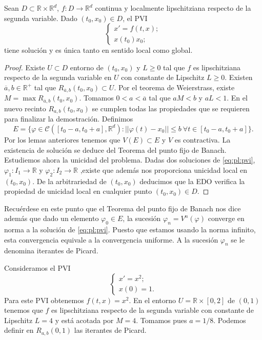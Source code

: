 \documentclass{article}
\begin{document}
\begin{thm}
  Sean $D \subset \mathbb{R} \times \mathbb{R}^d$, $f: D \to \mathbb{R}^d$ continua y localmente
  lipschitziana respecto de la segunda variable. Dado $(t_0, x_0) \in D$, el PVI
  \begin{equation}
    \label{eq:pl:pvi}
    \begin{cases}
      x' = f(t,x); \\ x(t_0) x_0;
    \end{cases}
  \end{equation}
  tiene solución y es única tanto en sentido local como global.
\end{thm}
\begin{proof}
  Existe $U \subset D$ entorno de $(t_0, x_0)$ y $L \ge 0$ tal que $f$ es lipschitziana respecto de
  la segunda variable en $U$ con constante de Lipschitz $L \ge 0$. Existen
  $\overline{a}, b \in \mathbb{R}^+$ tal que $R_{\overline{a},b}(t_0, x_0) \subset U$. Por el
  teorema de Weierstrass, existe $M = \max R_{\overline{a},b}(t_0, x_0)$. Tomamos
  $0 < a < \overline{a}$ tal que $a M < b$ y $a L < 1$. En el nuevo recinto $R_{a,b}(t_0, x_0)$ se
  cumplen todas las propiedades que se requieren para finalizar la demostración. Definimos
  \[E = \{\varphi \in \mathcal{C}([t_0-a, t_0+a], \mathbb{R}^d): ||\varphi(t)-x_0|| \le b \ \forall
    t \in [t_0-a, t_0+a]\}.\] Por los lemas anteriores tenemos que $V(E) \subset E$ y $V$ es
  contractiva. La existencia de solución se deduce del Teorema del punto fijo de Banach. Estudiemos
  ahora la unicidad del problema. Dadas dos soluciones de \eqref{eq:pl:pvi},
  $\varphi_1: I_1 \to \mathbb{R}$ y $\varphi_2: I_2 \to \mathbb{R}$ ,existe que además nos
  proporciona unicidad local en $(t_0, x_0)$.  De la arbitrariedad de $(t_0, x_0)$ deducimos que la
  EDO verifica la propiedad de unicidad local en cualquier punto $(t_0, x_0) \in D$.
\end{proof}

Recuérdese en este punto que el Teorema del punto fijo de Banach nos dice además que dado un elemento $\varphi_0 \in E$, la sucesión $\varphi_n = V^n(\varphi)$ converge en norma a la solución de \ref{eq:pl:pvi}. Puesto que estamos usando la norma infinito, esta convergencia equivale a la convergencia uniforme. A la sucesión $\varphi_n$ se le denomina iterantes de Picard.

\begin{ex}
  Consideramos el PVI
  \begin{equation}
    \begin{cases}
      x' = x^2; \\ x(0) = 1.
    \end{cases}
  \end{equation}
  Para este PVI obtenemos $f(t,x) = x^2$. En el entorno $U = \mathbb{R} \times [0,2]$ de $(0,1)$ tenemos que $f$ es lipschitziana respecto de la segunda variable con constante de Lipschitz $L = 4$ y está acotada por $M = 4$. Tomamos pues $a = 1/8$. Podemos definir en $R_{a,b}(0,1)$ las iterantes de Picard.
\end{ex}
\end{document}
